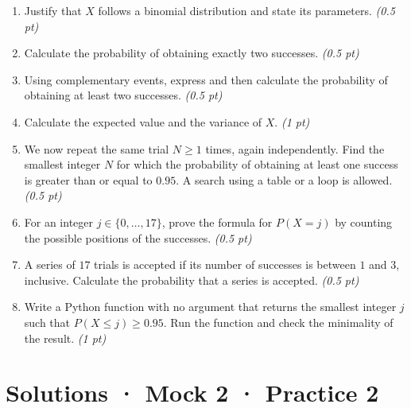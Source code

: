 \begin{enumerate}

\item Justify that $X$ follows a binomial distribution and state its parameters. \hfill\textit{(0.5 pt)}

\item Calculate the probability of obtaining exactly two successes. \hfill\textit{(0.5 pt)}

\item Using complementary events, express and then calculate the probability of obtaining at least two successes. \hfill\textit{(0.5 pt)}

\item Calculate the expected value and the variance of $X$. \hfill\textit{(1 pt)}

\item We now repeat the same trial $N\ge1$ times, again independently. Find the smallest integer $N$ for which the probability of obtaining at least one success is greater than or equal to $\num{0,95}$. A search using a table or a loop is allowed. \hfill\textit{(0.5 pt)}

\item For an integer $j\in\{0,\ldots,17\}$, prove the formula for $P(X=j)$ by counting the possible positions of the successes. \hfill\textit{(0.5 pt)}

\item A series of $17$ trials is accepted if its number of successes is between $1$ and $3$, inclusive. Calculate the probability that a series is accepted. \hfill\textit{(0.5 pt)}

\item Write a Python function with no argument that returns the smallest integer $j$ such that $P(X\le j)\ge\num{0,95}$. Run the function and check the minimality of the result. \hfill\textit{(1 pt)}

\end{enumerate}

\ifmxteacher\mxnewpage

\section*{Solutions · Mock 2 · Practice 2}\label{cor:8-2}

